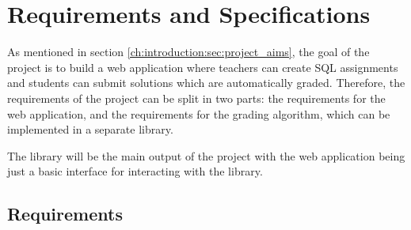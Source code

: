 \chapter{Requirements and Specifications} \label{ch:reqandspec}

As mentioned in section \ref{ch:introduction:sec:project_aims}, the goal of the project is to build a web application where teachers can create SQL assignments and students can submit solutions which are automatically graded. Therefore, the requirements of the project can be split in two parts: the requirements for the web application, and the requirements for the grading algorithm, which can be implemented in a separate library. 

The library will be the main output of the project with the web application being just a basic interface for interacting with the library.

\section{Requirements} \label{ch:reqandspec:sec:rec}

